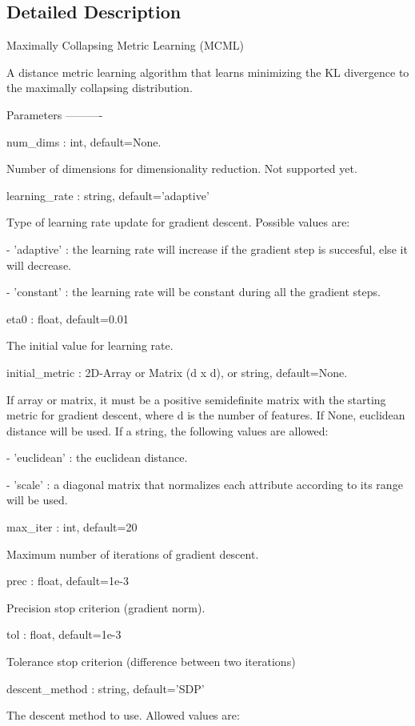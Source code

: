 \subsection{Detailed Description}
\begin{DoxyVerb}Maximally Collapsing Metric Learning (MCML)

A distance metric learning algorithm that learns minimizing the KL divergence to the maximally collapsing distribution.

Parameters
----------

num_dims : int, default=None.

    Number of dimensions for dimensionality reduction. Not supported yet.

learning_rate : string, default='adaptive'

    Type of learning rate update for gradient descent. Possible values are:

    - 'adaptive' : the learning rate will increase if the gradient step is succesful, else it will decrease.

    - 'constant' : the learning rate will be constant during all the gradient steps.

eta0 : float, default=0.01

    The initial value for learning rate.

initial_metric : 2D-Array or Matrix (d x d), or string, default=None.

    If array or matrix, it must be a positive semidefinite matrix with the starting metric for gradient descent, where d is the number of features.
    If None, euclidean distance will be used. If a string, the following values are allowed:

    - 'euclidean' : the euclidean distance.

    - 'scale' : a diagonal matrix that normalizes each attribute according to its range will be used.

max_iter : int, default=20

    Maximum number of iterations of gradient descent.

prec : float, default=1e-3

    Precision stop criterion (gradient norm).

tol : float, default=1e-3

    Tolerance stop criterion (difference between two iterations)

descent_method : string, default='SDP'

    The descent method to use. Allowed values are:


\end{DoxyVerb}
